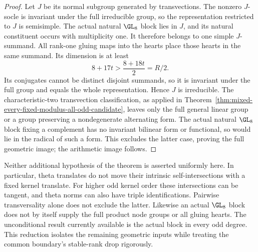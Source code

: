 \begin{proof}
Let $J$ be its normal subgroup generated by transvections.
The nonzero $J$-socle is invariant under the full irreducible group,
so the representation restricted to $J$ is semisimple.
The actual natural $\GL_8$ block lies in $J$, and its natural
constituent occurs with multiplicity one. It therefore belongs to
one simple $J$-summand. All rank-one gluing maps into the hearts
place those hearts in the same summand. Its dimension is at least
\[
                       8+17t>\frac{8+18t}{2}=R/2.
\]
Its conjugates cannot be distinct disjoint summands, so it is
invariant under the full group and equals the whole representation.
Hence $J$ is irreducible. The characteristic-two transvection
classification, as applied in
Theorem~\ref{thm:mixed-every-fixed-modulus-all-odd-candidate}, leaves
only the full general linear group or a group preserving a
nondegenerate alternating form. The actual natural $\GL_8$ block
fixing a complement has no invariant bilinear form or functional,
so would lie in the radical of such a form. This excludes the latter
case, proving the full geometric image; the arithmetic image follows.
\end{proof}

\begin{remark}
\label{rem:three-theta-conditional-geometric-gates-candidate}
Neither additional hypothesis of the theorem is asserted uniformly
here. In particular, theta translates do not move their intrinsic
self-intersections with a fixed kernel translate. For higher odd
kernel order these intersections can be tangent, and theta norms
can also have triple identifications. Pairwise transversality alone
does not exclude the latter. Likewise an actual $\GL_8$ block does
not by itself supply the full product node groups or all gluing
hearts. The unconditional result currently available is the actual
block in every odd degree. This reduction isolates the remaining
geometric inputs while treating the common boundary's stable-rank
drop rigorously.
\end{remark}
